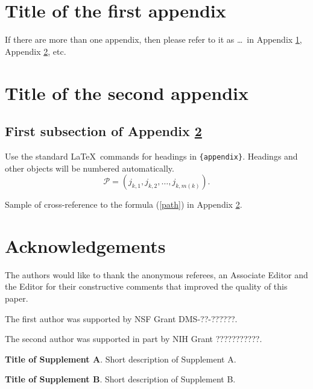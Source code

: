\documentclass[aos,preprint]{imsart}
\theoremstyle{remark}
\begin{document}
\begin{appendix}
\section{Title of the first appendix}\label{appA}
If there are more than one appendix, then please refer to it
as \ldots\ in Appendix \ref{appA}, Appendix \ref{appB}, etc.

\section{Title of the second appendix}\label{appB}
\subsection{First subsection of Appendix \protect\ref{appB}}

Use the standard \LaTeX\ commands for headings in \verb|{appendix}|.
Headings and other objects will be numbered automatically.
\begin{equation}
\mathcal{P}=(j_{k,1},j_{k,2},\dots,j_{k,m(k)}). \label{path}
\end{equation}

Sample of cross-reference to the formula (\ref{path}) in Appendix \ref{appB}.
\end{appendix}

\section*{Acknowledgements}
The authors would like to thank the anonymous referees, an Associate
Editor and the Editor for their constructive comments that improved the
quality of this paper.

The first author was supported by NSF Grant DMS-??-??????.

The second author was supported in part by NIH Grant ???????????.


\begin{supplement}
\textbf{Title of Supplement A}.
Short description of Supplement A.
\end{supplement}
\begin{supplement}
\textbf{Title of Supplement B}.
Short description of Supplement B.
\end{supplement}
\end{document}

